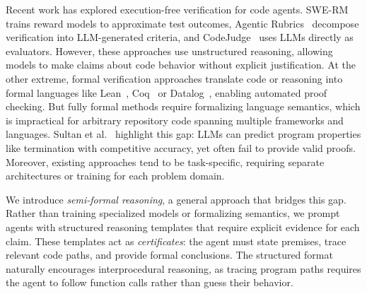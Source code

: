 \documentclass[]{meta}
\begin{document}
Recent work has explored execution-free verification for code agents. SWE-RM~\cite{shum2025swerm} trains reward models to approximate test outcomes, Agentic Rubrics~\cite{raghavendra2025rubrics} decompose verification into LLM-generated criteria, and CodeJudge~\cite{tong2024codejudge} uses LLMs directly as evaluators. However, these approaches use unstructured reasoning, allowing models to make claims about code behavior without explicit justification.
At the other extreme, formal verification approaches translate code or reasoning into formal languages like Lean~\cite{ye2025verinabenchmarkingverifiablecode, thakur2025clevercuratedbenchmarkformally}, Coq~\cite{kasibatla2025cobblestonedivideandconquerapproachautomating} or Datalog~\cite{sistla2025verifiedcodereasoningllms}, enabling automated proof checking.
But fully formal methods require formalizing language semantics, which is impractical for arbitrary repository code spanning multiple frameworks and languages.
Sultan et al.~\cite{sultan2026llmsversushaltingproblem} highlight this gap: LLMs can predict program properties like termination with competitive accuracy, yet often fail to provide valid proofs. Moreover, existing approaches tend to be task-specific, requiring separate architectures or training for each problem domain.

We introduce \emph{semi-formal reasoning}, a general approach that bridges this gap.
Rather than training specialized models or formalizing semantics, we prompt agents with structured reasoning templates that require explicit evidence for each claim.
These templates act as \emph{certificates}: the agent must state premises, trace relevant code paths, and provide formal conclusions.
The structured format naturally encourages interprocedural reasoning, as tracing program paths requires the agent to follow function calls rather than guess their behavior.
\end{document}
